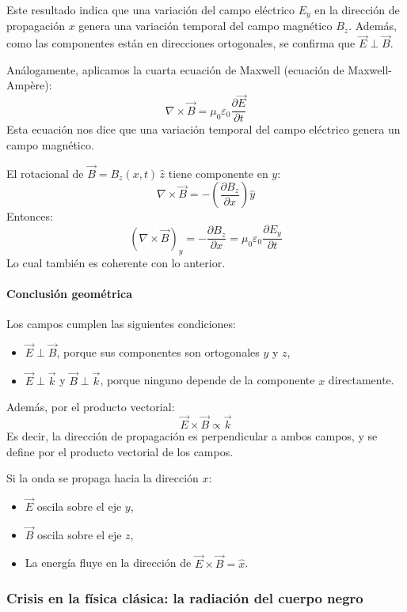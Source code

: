 Este resultado indica que una variación del campo eléctrico \(E_y\) en la dirección de propagación \(x\) genera una variación temporal del campo magnético \(B_z\). Además, como las componentes están en direcciones ortogonales, se confirma que \(\vec{E} \perp \vec{B}\).

Análogamente, aplicamos la cuarta ecuación de Maxwell (ecuación de Maxwell-Ampère):
\[
\nabla \times \vec{B} = \mu_0 \varepsilon_0 \frac{\partial \vec{E}}{\partial t}
\]
Esta ecuación nos dice que una variación temporal del campo eléctrico genera un campo magnético.

El rotacional de \(\vec{B} = B_z(x,t)\, \hat{z}\) tiene componente en \(y\):
\[
\nabla \times \vec{B} = -\left( \frac{\partial B_z}{\partial x} \right) \hat{y}
\]
Entonces:
\[
\left( \nabla \times \vec{B} \right)_y = -\frac{\partial B_z}{\partial x} = \mu_0 \varepsilon_0 \frac{\partial E_y}{\partial t}
\]
Lo cual también es coherente con lo anterior.

\paragraph{Conclusión geométrica}

Los campos cumplen las siguientes condiciones:
\begin{itemize}
  \item \(\vec{E} \perp \vec{B}\), porque sus componentes son ortogonales \(y\) y \(z\),
  \item \(\vec{E} \perp \vec{k}\) y \(\vec{B} \perp \vec{k}\), porque ninguno depende de la componente \(x\) directamente.
\end{itemize}
Además, por el producto vectorial:
\[
\vec{E} \times \vec{B} \propto \vec{k}
\]
Es decir, la dirección de propagación es perpendicular a ambos campos, y se define por el producto vectorial de los campos.

Si la onda se propaga hacia la dirección \(x\):
\begin{itemize}
  \item \(\vec{E}\) oscila sobre el eje \(y\),
  \item \(\vec{B}\) oscila sobre el eje \(z\),
  \item La energía fluye en la dirección de \(\vec{E} \times \vec{B} = \hat{x}\).
\end{itemize}

\subsubsection{Crisis en la física clásica: la radiación del cuerpo negro}

